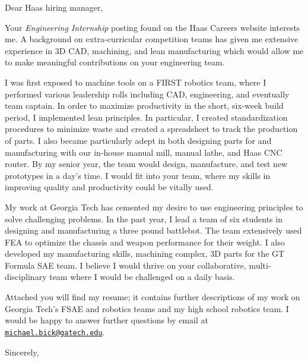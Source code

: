 \documentclass[12pt]{cover_letter}
\date{April 16, 2018}
\begin{document}
  \begin{letter}{}

    \opening{Dear Haas hiring manager,}

    \thispagestyle{fancy}

    Your \textit{Engineering Internship} posting found on the Haas Careers website interests me. A background on extra-curricular competition teams has given me extensive experience in 3D CAD, machining, and lean manufacturing which would allow me to make meaningful contributions on your engineering team.

    I was first exposed to machine tools on a FIRST robotics team, where I performed various leadership rolls including CAD, engineering, and eventually team captain. In order to maximize productivity in the short, six-week build period, I implemented lean principles. In particular, I created standardization procedures to minimize waste and created a spreadsheet to track the production of parts. I also became particularly adept in both designing parts for and manufacturing with our in-house manual mill, manual lathe, and Haas CNC router. By my senior year, the team would design, manufacture, and test new prototypes in a day's time. I would fit into your team, where my skills in improving quality and productivity could be vitally used.

    My work at Georgia Tech has cemented my desire to use engineering principles to solve challenging problems. In the past year, I lead a team of six students in designing and manufacturing a three pound battlebot. The team extensively used FEA to optimize the chassis and weapon performance for their weight. I also developed my manufacturing skills, machining complex, 3D parts for the GT Formula SAE team. I believe I would thrive on your collaborative, multi-disciplinary team where I would be challenged on a daily basis.

    Attached you will find my resume; it contains further descriptions of my work on Georgia Tech's FSAE and robotics teams and my high school robotics team. I would be happy to answer further questions by email at \href{mailto:michael.bick@gatech.edu}{\nolinkurl{michael.bick@gatech.edu}}.

    \closing{Sincerely,}

  \end{letter}
\end{document}
